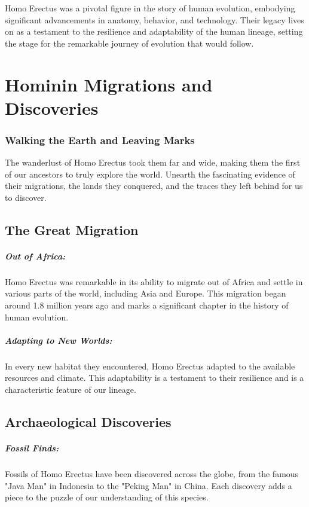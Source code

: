 \documentclass[a4paper,12pt]{book}
\begin{document}
Homo Erectus was a pivotal figure in the story of human evolution, embodying significant advancements in anatomy, behavior, and technology. Their legacy lives on as a testament to the resilience and adaptability of the human lineage, setting the stage for the remarkable journey of evolution that would follow.

\chapter{Hominin Migrations and Discoveries}
\subsection*{Walking the Earth and Leaving Marks}
The wanderlust of Homo Erectus took them far and wide, making them the first of our ancestors to truly explore the world. Unearth the fascinating evidence of their migrations, the lands they conquered, and the traces they left behind for us to discover.

\section*{The Great Migration}

\paragraph{Out of Africa:}
Homo Erectus was remarkable in its ability to migrate out of Africa and settle in various parts of the world, including Asia and Europe. This migration began around 1.8 million years ago and marks a significant chapter in the history of human evolution.

\paragraph{Adapting to New Worlds:}
In every new habitat they encountered, Homo Erectus adapted to the available resources and climate. This adaptability is a testament to their resilience and is a characteristic feature of our lineage.

\section*{Archaeological Discoveries}

\paragraph{Fossil Finds:}
Fossils of Homo Erectus have been discovered across the globe, from the famous "Java Man" in Indonesia to the "Peking Man" in China. Each discovery adds a piece to the puzzle of our understanding of this species.
\end{document}
